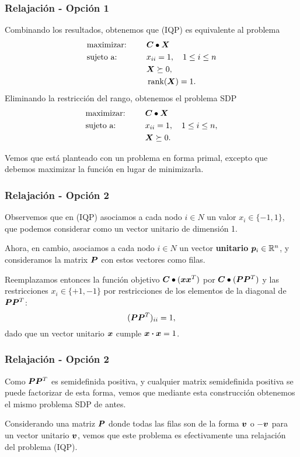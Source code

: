\documentclass[aspectratio=169,12pt,spanish]{beamer}
\begin{document}
\begin{frame}
\frametitle{Relajación - Opción 1}

Combinando los resultados, obtenemos que (IQP) es equivalente al problema
{\small
\begin{alignat*}{2}
  & \text{maximizar: } & \quad & \bm{C} \bullet \bm{X}  \\
  & \text{sujeto a: } & \quad & x_{ii} = 1, \quad 1 \le i \le n \\
  &&& \bm{X} \succeq 0, \\
  &&& \operatorname{rank}(\bm{X}) = 1.
\end{alignat*}
}
Eliminando la restricción del rango, obtenemos el problema SDP
\begin{alignat*}{2}
  & \text{maximizar: } & \quad & \bm{C} \bullet \bm{X}  \\
  & \text{sujeto a: } & \quad & x_{ii} = 1, \quad  1 \le i \le n, \\
  &&& \bm{X} \succeq 0.
\end{alignat*}

Vemos que está planteado con un problema en forma primal, excepto que debemos maximizar la función en lugar de minimizarla.
\end{frame}


\begin{frame}
\frametitle{Relajación - Opción 2}

Observemos que en (IQP) asociamos a cada nodo $i \in N$ un valor $x_i \in \{-1, 1\}$, que podemos considerar como un vector unitario de dimensión 1.

Ahora, en cambio, asociamos a cada nodo $i \in N$ un vector  \textbf{unitario} $\bm{p}_i \in \mathbb{R}^n$, y consideramos la matrix $\bm{P}$ con estos vectores como filas.

Reemplazamos entonces la función objetivo $\bm{C} \bullet (\bm{x}\bm{x}^T)$ por $\bm{C} \bullet (\bm{P}\bm{P}^T)$ y las restricciones $x_i \in \{+1, -1\}$ por restricciones de los elementos de la diagonal de $\bm{P}\bm{P}^T$:
$$(\bm{P}\bm{P}^T)_{ii} = 1,$$
dado que un vector unitario $\bm{x}$ cumple $\bm{x} \boldsymbol{\cdot} \bm{x} = 1$.
\end{frame}


\begin{frame}
\frametitle{Relajación - Opción 2}

Como $\bm{P}\bm{P}^T$ es  semidefinida positiva, y cualquier matrix semidefinida positiva se puede factorizar de esta forma, vemos que mediante esta construcción obtenemos el mismo problema SDP de antes.

Considerando una matriz $\bm{P}$ donde todas las filas son de la forma $\bm{v}$ o $-\bm{v}$ para un vector unitario $\bm{v}$, vemos que este problema es efectivamente una relajación del problema (IQP).

\end{frame}
\end{document}
